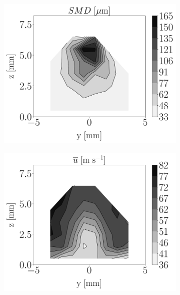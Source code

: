 \begin{figure}[ht]
\flushleft
\begin{subfigure}[b]{0.2\textwidth}
	\flushleft
	\hspace*{-0.45in}
   \includegraphics[scale=0.19]{./part2_developments/figures_ch6_lagrangian_JICF/injectors_SLI/uG100_dx10_x05_SMD_map}
\end{subfigure}
\hspace*{0.075in}
\begin{subfigure}[b]{0.2\textwidth}
	\flushleft
   \includegraphics[scale=0.19]{./part2_developments/figures_ch6_lagrangian_JICF/injectors_SLI/uG100_dx10_x05_ux_mean_map}

\end{subfigure}
\end{figure}
